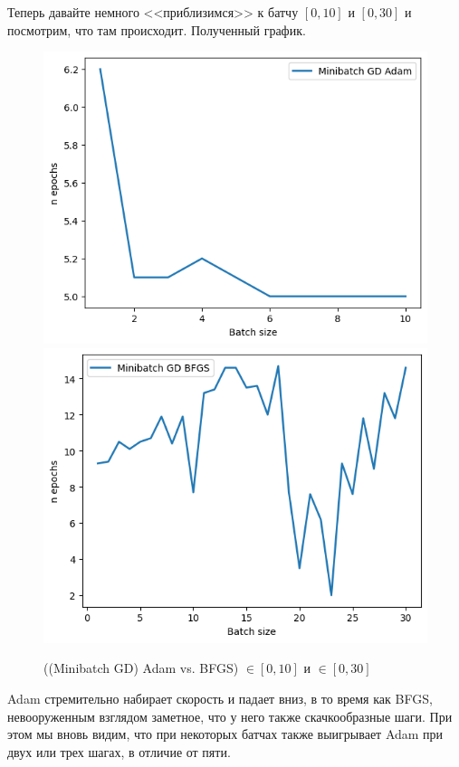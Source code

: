 \documentclass[12pt, a4paper, oneside, final]{article}
\begin{document}
	Теперь давайте немного <<приблизимся>> к батчу $[0, 10]$ и $[0, 30]$ и посмотрим, что там происходит.
	Полученный график.
	\begin{figure}[H]
		\centering
		\includegraphics[scale = 0.75]{Image/T2_ADAM_1_10.png}
		\includegraphics[scale = 0.75]{Image/T2_BFGS_1_10.png}
		\caption*{((Minibatch GD) Adam vs. BFGS) $\in [0, 10]$ и $\in [0, 30]$}
	\end{figure}
	Adam стремительно набирает скорость и падает вниз, в то время как BFGS, невооруженным взглядом заметное, что у него также скачкообразные шаги.
	При этом мы вновь видим, что при некоторых батчах также выигрывает Adam при двух или трех шагах, в отличие от пяти.
\end{document}

